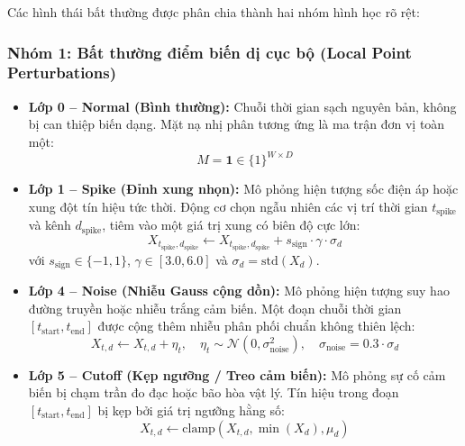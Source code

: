 \documentclass[11pt,journal,onecolumn]{IEEEtran}
\begin{document}
Các hình thái bất thường được phân chia thành hai nhóm hình học rõ rệt:

\subsubsection{Nhóm 1: Bất thường điểm biến dị cục bộ (Local Point Perturbations)}
\begin{itemize}
    \item \textbf{Lớp 0 -- Normal (Bình thường):} Chuỗi thời gian sạch nguyên bản, không bị can thiệp biến dạng. Mặt nạ nhị phân tương ứng là ma trận đơn vị toàn một:
    \begin{equation}
    M = \mathbf{1} \in \{1\}^{W \times D}
    \end{equation}
    
    \item \textbf{Lớp 1 -- Spike (Đỉnh xung nhọn):} Mô phỏng hiện tượng sốc điện áp hoặc xung đột tín hiệu tức thời. Động cơ chọn ngẫu nhiên các vị trí thời gian $t_{\text{spike}}$ và kênh $d_{\text{spike}}$, tiêm vào một giá trị xung có biên độ cực lớn:
    \begin{equation}
    X_{t_{\text{spike}}, d_{\text{spike}}} \leftarrow X_{t_{\text{spike}}, d_{\text{spike}}} + s_{\text{sign}} \cdot \gamma \cdot \sigma_d
    \end{equation}
    với $s_{\text{sign}} \in \{-1, 1\}$, $\gamma \in [3.0, 6.0]$ và $\sigma_d = \text{std}(X_d)$.
    
    \item \textbf{Lớp 4 -- Noise (Nhiễu Gauss cộng dồn):} Mô phỏng hiện tượng suy hao đường truyền hoặc nhiễu trắng cảm biến. Một đoạn chuỗi thời gian $[t_{\text{start}}, t_{\text{end}}]$ được cộng thêm nhiễu phân phối chuẩn không thiên lệch:
    \begin{equation}
    X_{t, d} \leftarrow X_{t, d} + \eta_t, \quad \eta_t \sim \mathcal{N}(0, \sigma_{\text{noise}}^2), \quad \sigma_{\text{noise}} = 0.3 \cdot \sigma_d
    \end{equation}
    
    \item \textbf{Lớp 5 -- Cutoff (Kẹp ngưỡng / Treo cảm biến):} Mô phỏng sự cố cảm biến bị chạm trần đo đạc hoặc bão hòa vật lý. Tín hiệu trong đoạn $[t_{\text{start}}, t_{\text{end}}]$ bị kẹp bởi giá trị ngưỡng hằng số:
    \begin{equation}
    X_{t, d} \leftarrow \text{clamp}(X_{t, d}, \min(X_d), \mu_d)
    \end{equation}
\end{itemize}
\end{document}
